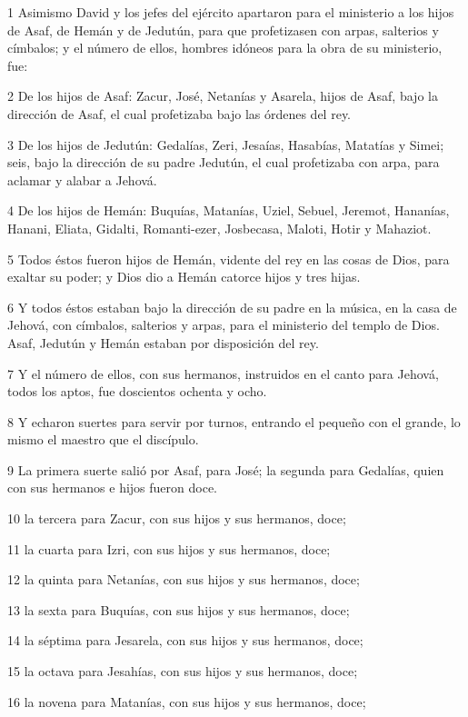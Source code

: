 \par 1 Asimismo David y los jefes del ejército apartaron para el ministerio a los hijos de Asaf, de Hemán y de Jedutún, para que profetizasen con arpas, salterios y címbalos; y el número de ellos, hombres idóneos para la obra de su ministerio, fue:
\par 2 De los hijos de Asaf: Zacur, José, Netanías y Asarela, hijos de Asaf, bajo la dirección de Asaf, el cual profetizaba bajo las órdenes del rey.
\par 3 De los hijos de Jedutún: Gedalías, Zeri, Jesaías, Hasabías, Matatías y Simei; seis, bajo la dirección de su padre Jedutún, el cual profetizaba con arpa, para aclamar y alabar a Jehová.
\par 4 De los hijos de Hemán: Buquías, Matanías, Uziel, Sebuel, Jeremot, Hananías, Hanani, Eliata, Gidalti, Romanti-ezer, Josbecasa, Maloti, Hotir y Mahaziot.
\par 5 Todos éstos fueron hijos de Hemán, vidente del rey en las cosas de Dios, para exaltar su poder; y Dios dio a Hemán catorce hijos y tres hijas.
\par 6 Y todos éstos estaban bajo la dirección de su padre en la música, en la casa de Jehová, con címbalos, salterios y arpas, para el ministerio del templo de Dios. Asaf, Jedutún y Hemán estaban por disposición del rey.
\par 7 Y el número de ellos, con sus hermanos, instruidos en el canto para Jehová, todos los aptos, fue doscientos ochenta y ocho.
\par 8 Y echaron suertes para servir por turnos, entrando el pequeño con el grande, lo mismo el maestro que el discípulo.
\par 9 La primera suerte salió por Asaf, para José; la segunda para Gedalías, quien con sus hermanos e hijos fueron doce.
\par 10 la tercera para Zacur, con sus hijos y sus hermanos, doce;
\par 11 la cuarta para Izri, con sus hijos y sus hermanos, doce;
\par 12 la quinta para Netanías, con sus hijos y sus hermanos, doce;
\par 13 la sexta para Buquías, con sus hijos y sus hermanos, doce;
\par 14 la séptima para Jesarela, con sus hijos y sus hermanos, doce;
\par 15 la octava para Jesahías, con sus hijos y sus hermanos, doce;
\par 16 la novena para Matanías, con sus hijos y sus hermanos, doce;
